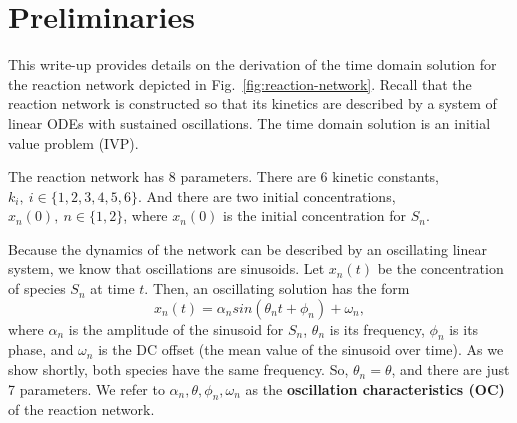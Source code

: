\documentclass{bmcart}
\begin{document}



\setlength{\parindent}{15pt}

\section{Preliminaries}

This write-up provides details on the derivation of the
time domain solution for the
reaction network depicted in Fig.~\ref{fig:reaction-network}.
Recall that the reaction network is constructed so that its kinetics are described by a system of linear ODEs with sustained oscillations.
The time domain solution is an initial value problem (IVP).

\par
The reaction network has 8 parameters. There are 6 kinetic constants,
$k_i,~ i\in \{1, 2, 3, 4, 5, 6\}$. And there are two initial
concentrations, $x_n (0),~ n \in \{1, 2 \}$, where $x_n(0)$ is the
initial concentration for $S_n$.

Because the dynamics of the network can be described by an oscillating linear system, we
know that oscillations are sinusoids.
Let $x_n (t)$ be the concentration
of species $S_n$ at time $t$. Then, an oscillating solution has the
form \begin{equation*}
x_n(t) = \alpha_n sin(\theta_n t + \phi_n) + \omega_n,
\end{equation*} where $\alpha_n$ is the amplitude of the sinusoid for
$S_n$, $\theta_n$ is its frequency, $\phi_n$ is its phase, and
$\omega_n$ is the DC offset (the mean value of the sinusoid over
time).
As we show shortly, both species have the same frequency.
So, $\theta_n = \theta$, and there are just 7 parameters.
We refer to $\alpha_n, \theta, \phi_n, \omega_n$ as the
\textbf{oscillation characteristics (OC)} of the reaction network.
\end{document}
